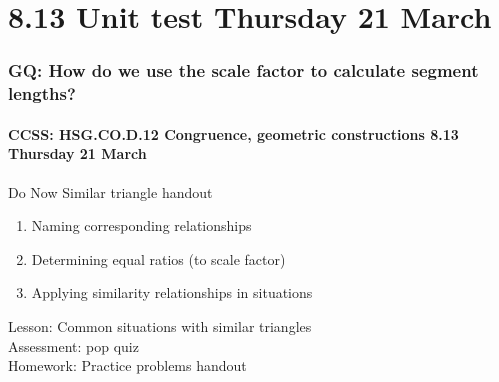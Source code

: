 \documentclass{beamer}
\begin{document}
\section{8.13 Unit test Thursday 21 March}
  \frame
  {
    \frametitle{GQ: How do we use the scale factor to calculate segment lengths?}
    \framesubtitle{CCSS: HSG.CO.D.12 Congruence, geometric constructions \hfill \alert{8.13 Thursday 21 March}}

    \begin{block}{Do Now Similar triangle handout}
      \begin{enumerate}
        \item Naming corresponding relationships
        \item Determining equal ratios (to scale factor)
        \item Applying similarity relationships in situations
      \end{enumerate}
    \end{block}
    Lesson: Common situations with similar triangles\\
    Assessment: pop quiz\\[0.5cm]
    Homework: Practice problems handout
  }
\end{document}
